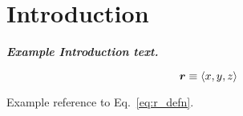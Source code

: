 \section{\label{sec:intro}Introduction}

\emph{\textbf{Example Introduction text.}}
\lipsum[1]

\begin{equation}
  \boldsymbol{r} \equiv \langle x, y, z \rangle
  \label{eq:r_defn}
\end{equation}

Example reference to Eq.~\ref{eq:r_defn}.\\

\lipsum[2]
